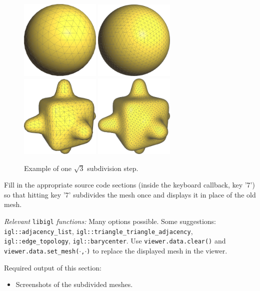 \documentclass[11pt]{amsart}
\begin{document}
\begin{figure}[h!]
   \centering
   \includegraphics[width=3.8cm]{sphere_before}
   \includegraphics[width=3.8cm]{sphere_after}
\hspace{.2cm}
   \includegraphics[width=3.8cm]{bumpy_before}
   \includegraphics[width=3.8cm]{bumpy_after}
   \caption{Example of one $\sqrt{3}$ subdivision step.}
   \label{fig:subdivision2}
\end{figure}

\noindent Fill in the appropriate source code sections (inside the keyboard
callback, key '7') so that hitting key '7' subdivides the mesh once and displays
it in place of the old mesh. 

\emph{Relevant} \texttt{libigl} \emph{functions: } Many options possible. Some
suggestions: \texttt{igl::adjacency\_list},
\texttt{igl::triangle\_triangle\_adjacency}, \texttt{igl::edge\_topology},
\texttt{igl::barycenter}. Use \texttt{viewer.data.clear()} and
\texttt{viewer.data.set\_mesh($\cdot$,$\cdot$)} to replace the displayed mesh in
the viewer.

\vspace{0.5cm}

Required output of this section:
\begin{itemize}
\item{Screenshots of the subdivided meshes.}
\end{itemize}



\end{document}
